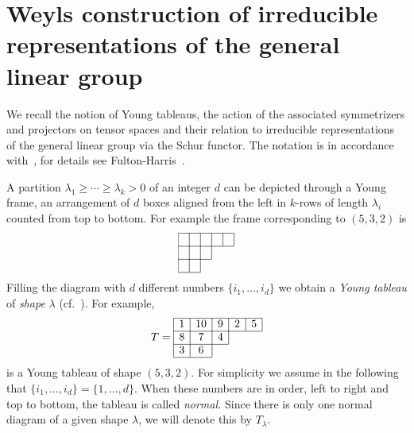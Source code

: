 \documentclass[11pt,a4paper]{article}
\theoremstyle{plain}
\theoremstyle{remark}
\begin{document}
\section{Weyls construction of irreducible representations of the general linear group}
\label{se:introduction_to_Young_symmetrizers}
We recall the notion of Young tableaus, the action of the associated symmetrizers and projectors on tensor spaces 
and their relation to  irreducible representations of the general linear group via the Schur functor. 
The notation is in accordance with~\cite{Sch}, for details see Fulton-Harris~\cite{F,FH}. 


A partition $\lambda_1\geq \cdots \geq \lambda_k >0$ of an integer $d$ can be depicted through a
Young frame, an arrangement of $d$ boxes aligned from the left in $k$-rows of length $\lambda_i$ counted from top to bottom. 
For example the frame corresponding to $(5,3,2)$ is
$$%
\begin{array}{|c|c|c|c|c|}
\cline{1-5}
 &  &  &  &  \\
\cline{1-5} 
 &  &  & \multicolumn{2}{c}{\;\;}\\
\cline{1-3}
 &  &  \multicolumn{3}{c}{\;\;}\\
\cline{1-2}
\end{array}
 $$
Filling the diagram with $d$ different numbers $\{i_1,\ldots,i_d\}$ we
obtain a {\em Young tableau} of {\em shape} $\lambda$ (cf.~\cite{F}). For example,
\begin{equation}\label{eq:normal_standard_Young_tableau}
T= \begin{array}{|c|c|c|c|c|}
\cline{1-5}
1 & 10 & 9 & 2 & 5\\
\cline{1-5}
8 & 7 & 4 & \multicolumn{1}{c}{\;\;} \\
\cline{1-3}
3 & 6 & \multicolumn{2}{c}{\;\;}\\
 \cline{1-2}
\end{array}
\end{equation}
 is a Young tableau of shape $(5,3,2)$.  For simplicity we assume 
in the following that $\{i_1,\ldots,i_d\} = \{1,\ldots,d\}$. When these
numbers are in order, left to right and top to bottom, the tableau is called
{\em normal.} Since there is only one normal diagram of a given shape $\lambda$, we will denote this by
 $T_\lambda$. 
\end{document}

